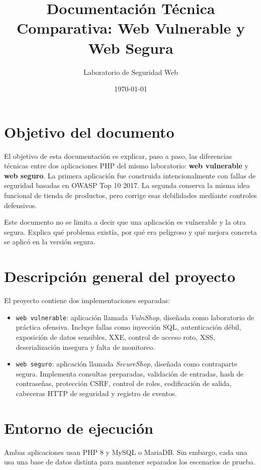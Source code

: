 \documentclass[12pt,a4paper]{article}
\title{Documentación Técnica Comparativa: Web Vulnerable y Web Segura}
\author{Laboratorio de Seguridad Web}
\date{\today}
\begin{document}
\maketitle
\tableofcontents
\newpage

\section{Objetivo del documento}

El objetivo de esta documentación es explicar, paso a paso, las diferencias técnicas entre dos aplicaciones PHP del mismo laboratorio: \textbf{web vulnerable} y \textbf{web seguro}. La primera aplicación fue construida intencionalmente con fallas de seguridad basadas en OWASP Top 10 2017. La segunda conserva la misma idea funcional de tienda de productos, pero corrige esas debilidades mediante controles defensivos.

Este documento no se limita a decir que una aplicación es vulnerable y la otra segura. Explica qué problema existía, por qué era peligroso y qué mejora concreta se aplicó en la versión segura.

\section{Descripción general del proyecto}

El proyecto contiene dos implementaciones separadas:

\begin{itemize}[leftmargin=*]
    \item \texttt{web vulnerable}: aplicación llamada \textit{VulnShop}, diseñada como laboratorio de práctica ofensiva. Incluye fallas como inyección SQL, autenticación débil, exposición de datos sensibles, XXE, control de acceso roto, XSS, deserialización insegura y falta de monitoreo.
    \item \texttt{web seguro}: aplicación llamada \textit{SecureShop}, diseñada como contraparte segura. Implementa consultas preparadas, validación de entradas, hash de contraseñas, protección CSRF, control de roles, codificación de salida, cabeceras HTTP de seguridad y registro de eventos.
\end{itemize}

\section{Entorno de ejecución}

Ambas aplicaciones usan PHP 8 y MySQL o MariaDB. Sin embargo, cada una usa una base de datos distinta para mantener separados los escenarios de prueba.
\end{document}

